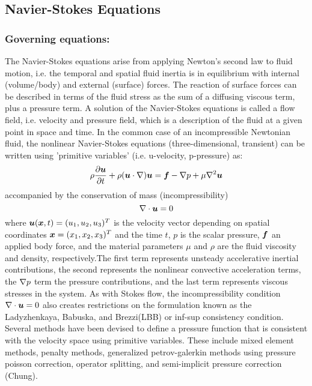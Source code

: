 \subsection{Navier-Stokes Equations} 

\subsubsection{Governing equations:}

The Navier-Stokes equations arise from applying Newton's second law to fluid motion, i.e. the temporal and spatial fluid inertia is in equilibrium with internal (volume/body)  and external (surface) forces. The reaction of surface forces can be described in terms of the fluid stress as the sum of a diffusing viscous term, plus a pressure term. A solution of the Navier-Stokes equations is called a flow field, i.e. velocity and pressure field, which is a description of the fluid at a given point in space and time.  In the common case of an incompressible Newtonian fluid, the nonlinear Navier-Stokes equations (three-dimensional, transient) can be written using 'primitive variables' (i.e. u-velocity, p-pressure) as:
\begin{equation}
  \label{eqn:NSE}
    \rho\delby{\vect{u}}{t}+\rho(\vect{u}\cdot\grad)\vect{u}=\vect{f}-\grad{p}+\mu\laplacian{\vect{u}}
\end{equation}
accompanied by the conservation of mass (incompressibility)
\begin{equation}
  \label{eqn:NSEIncompressibility}
  \diverg{\vect{u}}=0
\end{equation}
where $\vect{u}(\vect{x},t)=(u_1,u_2,u_3)^T$ is the velocity vector depending on spatial coordinates $\vect{x}=(x_1,x_2,x_3)^T$ and the time $t$, $p$ is the scalar pressure, $\vect{f}$ an applied body force, and the material parameters $\mu$ and $\rho$ are the fluid viscosity and density, respectively.The first term represents unsteady accelerative inertial contributions, the second represents the nonlinear convective acceleration terms, the $\nabla{p}$ term the pressure contributions, and the last term represents viscous stresses in the system.
As with Stokes flow, the incompressibility condition $\diverg{\vect{u}}=0$ also creates restrictions on the formulation known as the Ladyzhenkaya, Babuska, and Brezzi(LBB) or inf-sup consistency condition. Several methods have been devised to define a pressure function that is consistent with the velocity space using primitive variables. These include mixed element methods, penalty methods, generalized petrov-galerkin methods using pressure poisson correction, operator splitting, and semi-implicit pressure correction (Chung).

